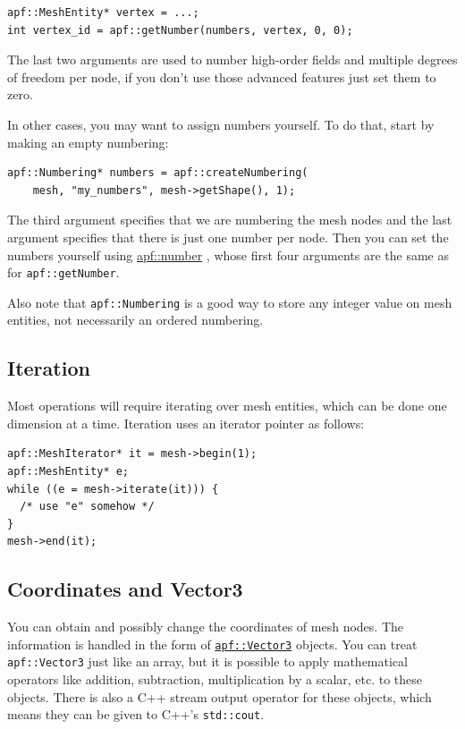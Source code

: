 \documentclass{article}
\begin{document}
\begin{lstlisting}
apf::MeshEntity* vertex = ...;
int vertex_id = apf::getNumber(numbers, vertex, 0, 0);
\end{lstlisting}

The last two arguments are used to number high-order fields and
multiple degrees of freedom per node, if you don't use those
advanced features just set them to zero.

In other cases, you may want to assign numbers yourself.
To do that, start by making an empty numbering:

\begin{lstlisting}
apf::Numbering* numbers = apf::createNumbering(
    mesh, "my_numbers", mesh->getShape(), 1);
\end{lstlisting}

The third argument specifies that we are numbering the mesh
nodes and the last argument specifies that there is just one
number per node.
Then you can set the numbers yourself using
\href{http://scorec.rpi.edu/~dibanez/core/namespaceapf.html#a3a8fafe58c4c2ec60a572692ffbaa1fd}{apf::number}
, whose first four arguments are the same as for
\texttt{apf::getNumber}.

Also note that \texttt{apf::Numbering} is a good way to store
any integer value on mesh entities, not necessarily an
ordered numbering.

\subsection{Iteration}

Most operations will require iterating over mesh entities,
which can be done one dimension at a time.
Iteration uses an iterator pointer as follows:

\begin{lstlisting}
apf::MeshIterator* it = mesh->begin(1);
apf::MeshEntity* e;
while ((e = mesh->iterate(it))) {
  /* use "e" somehow */
}
mesh->end(it);
\end{lstlisting}

\subsection{Coordinates and Vector3}

You can obtain and possibly change the coordinates of mesh nodes.
The information is handled in the form of
\href{http://scorec.rpi.edu/~dibanez/core/classapf_1_1Vector3.html#_details}{\texttt{apf::Vector3}}
objects.
You can treat \texttt{apf::Vector3} just like an array, but it is
possible to apply mathematical operators like addition, subtraction,
multiplication by a scalar, etc. to these objects.
There is also a C++ stream output operator for these objects, which
means they can be given to C++'s \texttt{std::cout}.
\end{document}
